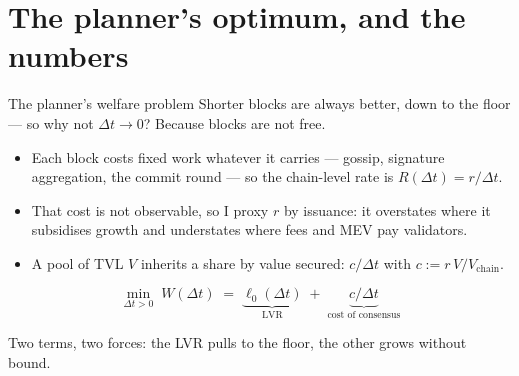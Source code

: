 \documentclass[10pt,xcolor=x11names,aspectratio=169]{beamer}
\newcommand{\dt}{\Delta t}
\newcommand{\1}{\mathbf{1}}
\begin{document}
\section{The planner's optimum, and the numbers}

\begin{frame}{The planner's welfare problem}
  Shorter blocks are always better, down to the floor --- so why not $\dt\to0$? Because
  blocks are not free.
  \begin{itemize}
    \item Each block costs fixed work whatever it carries --- gossip, signature
          aggregation, the commit round --- so the chain-level rate is
          $R(\dt) = r/\dt$.
    \item That cost is not observable, so I proxy $r$ by issuance: 
          it overstates where it subsidises growth and understates where fees 
          and MEV pay validators.
    \item A pool of TVL $V$ inherits a share by value secured:
          $c/\dt$ with $c := r\,V/V_{\text{chain}}$.
  \end{itemize}
  \begin{block}{}
    \[
      \min_{\dt>0}\; W(\dt) \;=\; \underbrace{\ell_0(\dt)}_{\text{LVR}}
      \;+\; \underbrace{c/\dt}_{\text{cost of consensus}}
    \]
  \end{block}
  \begin{takeaway}
    Two terms, two forces: the LVR pulls to the floor,
    the other grows without bound.
  \end{takeaway}
\end{frame}
\end{document}
